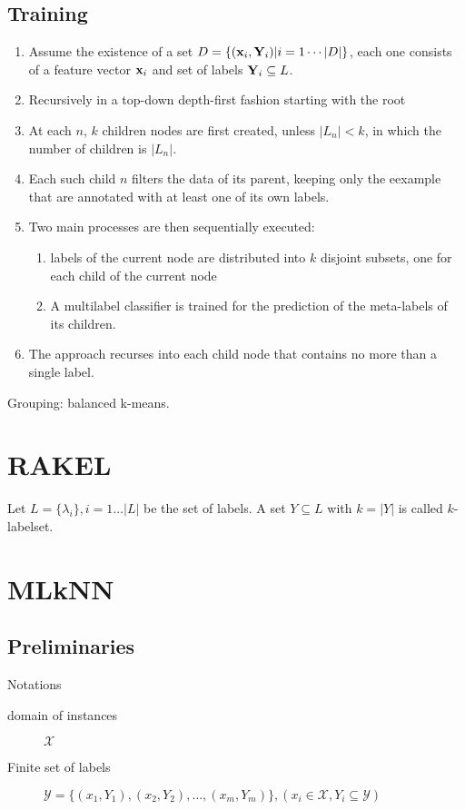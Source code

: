 \subsection{Training}
\begin{enumerate}
    \item Assume the existence of a set $D = \{(\mathbf{x}_i, \mathbf{Y}_i) | i = 1
        \cdots |D|\}$, each one consists of a feature vector $\mathbf{x}_i$ and
        set of labels $\mathbf{Y}_i \subseteq L$.
    \item Recursively in a top-down depth-first fashion starting with the
        root
    \item At each $n$, $k$ children nodes are first created, unless $|L_n|
        < k$, in which the number of children is $|L_n|$.
    \item Each such child $n$ filters the data of its parent, keeping only
        the eexample that are annotated with at least one of its own
        labels.
    \item Two main processes are then sequentially executed:
        \begin{enumerate}
            \item labels of the current node are distributed into $k$
                disjoint subsets, one for each child of the current node
            \item A multilabel classifier is trained for the prediction of
                the meta-labels of its children.
        \end{enumerate}
    \item The approach recurses into each child node that contains no more
        than a single label.
\end{enumerate}

Grouping: balanced k-means.

\section{RAKEL}
Let $L = \{\lambda_i\}, i = 1 \dots |L|$ be the set of labels. A set
$Y\subseteq L$ with $k = |Y|$ is called $k$-labelset.

\section{MLkNN}
\subsection{Preliminaries}
Notations
\begin{description}
    \item[domain of instances] $\mathcal{X}$
    \item[Finite set of labels] $\mathcal{Y} = \{(x_1, Y_1), (x_2, Y_2),
        \dots, (x_m, Y_m)\}, (x_i \in \mathcal{X}, Y_i \subseteq
        \mathcal{Y})$
\end{description}

